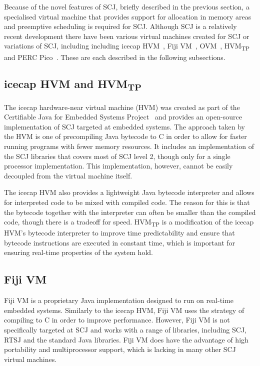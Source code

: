 \documentclass[a4paper,10pt]{report}
\begin{document}

Because of the novel features of SCJ, briefly described in the previous section,
a specialised virtual machine that provides support for allocation in memory
areas and preemptive scheduling is required for SCJ. Although SCJ is a
relatively recent development there have been various virtual machines created
for SCJ or variations of SCJ, including including icecap
HVM~\cite{sondergaard2012}, Fiji VM~\cite{pizlo2009}, OVM~\cite{armbruster2007},
HVM\textsubscript{TP}~\cite{luckow2014} and PERC Pico~\cite{atego2015,
  richard2010}. These are each described in the following subsections.

\subsection{icecap HVM and HVM\textsubscript{TP}}

The icecap hardware-near virtual machine (HVM) was created as part of the
Certifiable Java for Embedded Systems Project~\cite{schoeberl2014} and provides
an open-source implementation of SCJ targeted at embedded systems.  The
approach taken by the HVM is one of precompiling Java bytecode to C in order to
allow for faster running programs with fewer memory resources.  It includes an
implementation of the SCJ libraries that covers most of SCJ level 2, though only
for a single processor implementation.  This implementation, however, cannot be
easily decoupled from the virtual machine itself.

The icecap HVM also provides a lightweight Java bytecode interpreter and allows
for interpreted code to be mixed with compiled code.  The reason for this is
that the bytecode together with the interpreter can often be smaller than the
compiled code, though there is a tradeoff for speed. HVM\textsubscript{TP} is a
modification of the icecap HVM's bytecode interpreter to improve time
predictability and ensure that bytecode instructions are executed in constant
time, which is important for ensuring real-time properties of the system hold.

\subsection{Fiji VM}

Fiji VM is a proprietary Java implementation designed to run on real-time
embedded systems.  Similarly to the icecap HVM, Fiji VM uses the strategy of
compiling to C in order to improve performance.  However, Fiji VM is not
specifically targeted at SCJ and works with a range of libraries, including
SCJ, RTSJ and the standard Java libraries.  Fiji VM does have the advantage of
high portability and multiprocessor support, which is lacking in many other SCJ
virtual machines.
\end{document}
